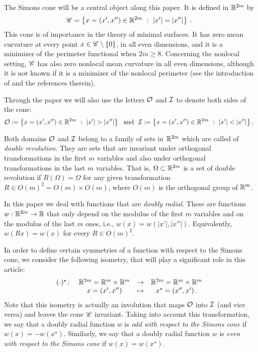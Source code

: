 The Simons cone will be a central object along this paper. It is defined in $\mathbb{R}^{2m}$ by
\begin{equation}
\label{Eq:SimonsCone}
\mathscr{C} = \left \{ x = (x', x'') \in \mathbb{R}^{2m} \ : \ |x'| = |x''| \right \}\,.
\end{equation}
This cone is of importance in the theory of minimal surfaces. It has zero mean curvature at every point $x\in \mathscr{C} \setminus \{0\}$, in all even dimensions, and it is a minimizer of the perimeter functional when $2m\geq 8$. Concerning the nonlocal setting, $\mathscr{C}$ has also zero nonlocal mean curvature in all even dimensions, although it is not known if it is a minimizer of the nonlocal perimeter (see the introduction of \cite{Felipe-Sanz-Perela:SaddleFractional} and the references therein).

Through the paper we will also use the letters $\mathcal{O}$ and $\mathcal{I}$ to denote both sides of the cone:
\begin{equation}
\label{Eq:DefOandI}
\mathcal{O}:= \left \{ x = (x', x'') \in \mathbb{R}^{2m} \ : \ |x'| > |x''| \right \} \ \textrm{ and } \
\mathcal{I}:= \left \{ x = (x', x'') \in \mathbb{R}^{2m} \ : \ |x'| < |x''| \right \}.
\end{equation}



Both domains $\mathcal{O}$ and $\mathcal{I}$ belong to a family of sets in $\mathbb{R}^{2m}$ which are called of \emph{double revolution}. They are sets that are invariant under orthogonal transformations in the first $m$ variables and also under orthogonal transformations in the last $m$ variables. That is, $\Omega\subset \mathbb{R}^{2m}$ is a set of double revolution if $R(\Omega) = \Omega$ for any given transformation $R\in O(m)^2 = O(m) \times O(m)$, where  $O(m)$ is the orthogonal group of $\mathbb{R}^m$.

In this paper we deal with functions that are \emph{doubly radial}. These are functions $w:\mathbb{R}^{2m}  \to \mathbb{R}$ that only depend on the modulus of the first $m$ variables and on the modulus of the last $m$ ones, i.e., $w(x) = w(|x'|,|x''|)$. Equivalently, $w(Rx) = w(x)$ for every $R \in O(m)^2$.

In order to define certain symmetries of a function with respect to the Simons cone, we consider the following isometry, that will play a significant role in this article:
\begin{equation}
\label{Eq:DefStar}
\begin{matrix}
(\cdot)^\star \colon & \mathbb{R}^{2m}= \mathbb{R}^{m}\times \mathbb{R}^{m}  &\to&  \mathbb{R}^{2m}= \mathbb{R}^{m}\times \mathbb{R}^{m}  \\
& x = (x',x'') &\mapsto & x^\star = (x'',x')\,.
\end{matrix}
\end{equation}
Note that this isometry is actually an involution that maps $\mathcal{O}$ into $\mathcal{I}$ (and vice versa) and leaves the cone $\mathscr{C}$ invariant. Taking into account this transformation, we say that a doubly radial function $w$ is \emph{odd with respect to the Simons cone} if $w(x) = -w(x^\star)$. Similarly, we say that a doubly radial function $w$ is \emph{even with respect to the Simons cone} if $w(x) = w(x^\star)$.

